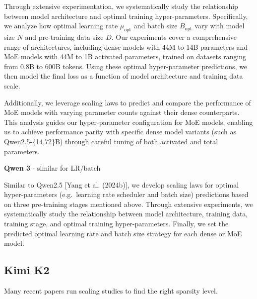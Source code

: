 \documentclass[12pt,twoside]{article}
\begin{document}
\begin{center}
    Through extensive experimentation, we systematically study the relationship between model architecture and optimal training hyper-parameters. Specifically, we analyze how optimal learning rate \(\mu_{\text{opt}}\) and batch size \(B_{\text{opt}}\) vary with model size \(N\) and pre-training data size \(D\). Our experiments cover a comprehensive range of architectures, including dense models with 44M to 14B parameters and MoE models with 44M to 1B activated parameters, trained on datasets ranging from 0.8B to 600B tokens. Using these optimal hyper-parameter predictions, we then model the final loss as a function of model architecture and training data scale.
\end{center}

\begin{center}
    Additionally, we leverage scaling laws to predict and compare the performance of MoE models with varying parameter counts against their dense counterparts. This analysis guides our hyper-parameter configuration for MoE models, enabling us to achieve performance parity with specific dense model variants (such as Qwen2.5-\{14,72\}B) through careful tuning of both activated and total parameters.
\end{center}

\textbf{Qwen 3} - similar for LR/batch

\begin{center}
    Similar to Qwen2.5 [Yang et al. (2024b)], we develop scaling laws for optimal hyper-parameters (e.g.\ learning rate scheduler and batch size) predictions based on three pre-training stages mentioned above. Through extensive experiments, we systematically study the relationship between model architecture, training data, training stage, and optimal training hyper-parameters. Finally, we set the predicted optimal learning rate and batch size strategy for each dense or MoE model.
\end{center}

\subsection*{Kimi K2}

Many recent papers run scaling studies to find the right sparsity level.
\end{document}
